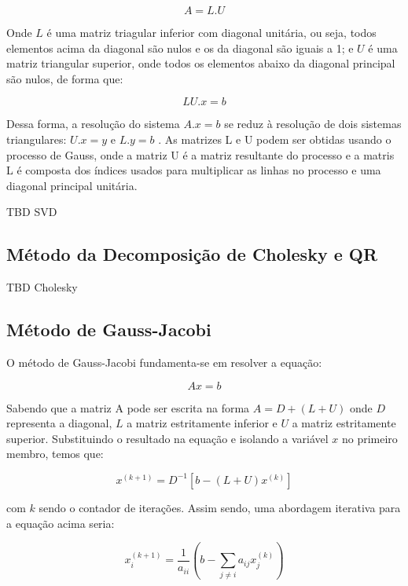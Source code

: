 \documentclass[a4paper,10pt]{report}
\begin{document}
\begin{equation*}
A = L.U
\end{equation*}

Onde $L$ é uma matriz triagular inferior com diagonal unitária, ou seja, todos elementos acima da diagonal são nulos e os da diagonal são iguais a 1; e $U$ é uma matriz triangular superior, onde todos os elementos abaixo da diagonal principal são nulos, de forma que: 

\begin{equation*}
LU.x = b
\end{equation*}

Dessa forma, a resolução do sistema $A.x = b$ se reduz à resolução de dois sistemas triangulares: $U.x = y$ e $L.y = b$ . As matrizes L e U podem ser obtidas usando o processo de Gauss, onde a matriz U é a matriz resultante do processo e a matris L é composta dos índices usados para multiplicar as linhas no processo e uma diagonal principal unitária.

TBD SVD

\subsection{Método da Decomposição de Cholesky e QR}


TBD Cholesky

\subsection{Método de Gauss-Jacobi}

O método de Gauss-Jacobi fundamenta-se em resolver a equação:

\begin{equation*}
Ax = b
\end{equation*}

Sabendo que a matriz A pode ser escrita na forma $ A = D + (L + U) $ onde $D$ representa a diagonal, $L$ a matriz estritamente inferior e $U$ a matriz estritamente superior. Substituindo o resultado na equação e isolando a variável $x$ no primeiro membro, temos que:

\begin{equation*}
x^{(k+1)}=D^{-1}[b-(L+U)x^{(k)}]
\end{equation*}

com $k$ sendo o contador de iterações. Assim sendo, uma abordagem iterativa para a equação acima seria:

\begin{equation*}
 x^{(k+1)}_{i}=\dfrac{1}{a_{ii}}(b-\sum_{j \neq i} a_{ij}x^{(k)}_{j})
\end{equation*}
\end{document}
